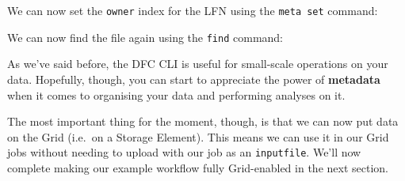 We can now set the \texttt{owner} index for the LFN using the
\texttt{meta\ set} command:

\begin{Shaded}
\begin{Highlighting}[]
\NormalTok{:/}\KeywordTok{>} 
 
\end{Highlighting}
\end{Shaded}

We can now find the file again using the \texttt{find} command:

\begin{Shaded}
\begin{Highlighting}[]
\NormalTok{:/}\KeywordTok{>} 
\NormalTok{: \{}\NormalTok{: }\NormalTok{\}}
 
\end{Highlighting}
\end{Shaded}

As we've said before, the DFC CLI is useful for small-scale operations
on your data. Hopefully, though, you can start to appreciate the power
of \textbf{metadata} when it comes to organising your data and
performing analyses on it.

The most important thing for the moment, though, is that we can now put
data on the Grid (i.e.~on a Storage Element). This means we can use it
in our Grid jobs without needing to upload with our job as an
\texttt{inputfile}. We'll now complete making our example workflow fully
Grid-enabled in the next section.
